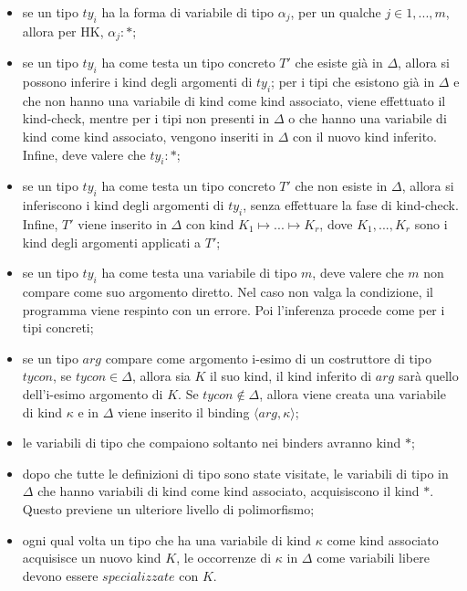 \documentclass[10pt,a4paper]{article}
\begin{document}
\begin{itemize}
    \item se un tipo $ ty_i $ ha la forma di variabile di tipo $ \alpha_j $, per un qualche $ j \in {1, ..., m} $, allora
    per HK, $ \alpha_j : * $;
    \item se un tipo $ ty_i $ ha come testa un tipo concreto $ T' $ che esiste già in $ \Delta $, allora si possono
    inferire i kind degli argomenti di $ ty_i $; per i tipi che esistono già in $ \Delta $ e che non hanno una variabile
    di kind come kind associato, viene effettuato il kind-check, mentre per i tipi non presenti in $ \Delta $ o che
    hanno una variabile di kind come kind associato, vengono inseriti in $ \Delta $ con il nuovo kind inferito. Infine,
    deve valere che $ ty_i : * $;
    \item se un tipo $ ty_i $ ha come testa un tipo concreto $ T' $ che non esiste in $ \Delta $, allora si inferiscono
    i kind degli argomenti di $ ty_i $, senza effettuare la fase di kind-check. Infine, $ T' $ viene inserito in
    $ \Delta $ con kind $ K_1 \mapsto ... \mapsto K_r $, dove $ K_1, ..., K_r $ sono i kind degli argomenti applicati a
    $ T' $;
    \item se un tipo $ ty_i $ ha come testa una variabile di tipo $ m $, deve valere che $ m $ non compare come suo
    argomento diretto. Nel caso non valga la condizione, il programma viene respinto con un errore. Poi l'inferenza
    procede come per i tipi concreti;
    \item se un tipo $ arg $ compare come argomento i-esimo di un costruttore di tipo $ tycon $, se $ tycon \in \Delta $,
    allora sia $ K $ il suo kind, il kind inferito di $ arg $ sarà quello dell'i-esimo argomento di $ K $. Se
    $ tycon \notin \Delta $, allora viene creata una variabile di kind $ \kappa $ e in $ \Delta $ viene inserito il
    binding $ \langle arg, \kappa \rangle $;
    \item le variabili di tipo che compaiono soltanto nei binders avranno kind $ * $;
    \item dopo che tutte le definizioni di tipo sono state visitate, le variabili di tipo in $ \Delta $ che hanno
    variabili di kind come kind associato, acquisiscono il kind $ * $. Questo previene un ulteriore livello di polimorfismo;
    \item ogni qual volta un tipo che ha una variabile di kind $ \kappa $ come kind associato acquisisce un nuovo kind
    $ K $, le occorrenze di $ \kappa $ in $ \Delta $ come variabili libere devono essere $ specializzate $ con $ K $.
\end{itemize}
\end{document}
